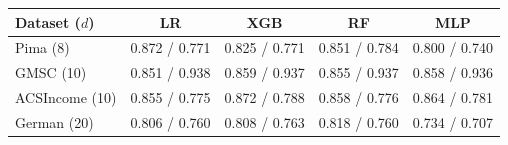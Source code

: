 \begin{tabular}{lcccc}
\toprule
Dataset ($d$) & LR & XGB & RF & MLP\\
\midrule
Pima (8) & 0.872 / 0.771 & 0.825 / 0.771 & 0.851 / 0.784 & 0.800 / 0.740\\
GMSC (10) & 0.851 / 0.938 & 0.859 / 0.937 & 0.855 / 0.937 & 0.858 / 0.936\\
ACSIncome (10) & 0.855 / 0.775 & 0.872 / 0.788 & 0.858 / 0.776 & 0.864 / 0.781\\
German (20) & 0.806 / 0.760 & 0.808 / 0.763 & 0.818 / 0.760 & 0.734 / 0.707\\
\bottomrule
\end{tabular}
